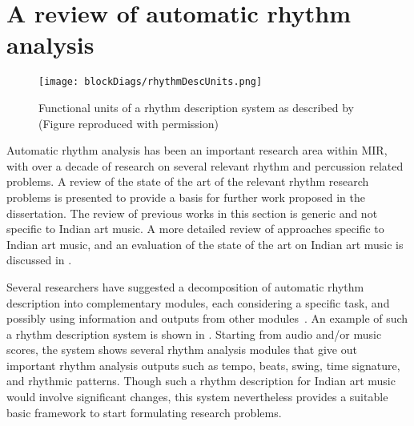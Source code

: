 \section[A review of automatic rhythm analysis]{A review of automatic rhythm\\ analysis}
\begin{figure}
\centering
\texttt{[image: blockDiags/rhythmDescUnits.png]}
\caption[Functional units of a rhythm description system]{Functional units of a rhythm description system as described by \protect{} (Figure reproduced with permission)}\label{fig:sota:rhythmdescsys}
\end{figure}
Automatic rhythm analysis has been an important research area within \gls{MIR}, with over a decade of research on several relevant rhythm and percussion related problems. A review of the state of the art of the relevant rhythm research problems is presented to provide a basis for further work proposed in the dissertation. The review of previous works in this section is generic and not specific to Indian art music. A more detailed review of approaches specific to Indian art music, and an evaluation of the state of the art on Indian art music is discussed in . 
%

Several researchers have suggested a decomposition of automatic rhythm description into complementary modules, each considering a specific task, and possibly using information and outputs from other modules~\cite{gouyon:05:phdthesis,gouyon:05:review}. An example of such a rhythm description system is shown in . Starting from audio and/or music scores, the system shows several rhythm analysis modules that give out important rhythm analysis outputs such as tempo, beats, swing, time signature, and rhythmic patterns. Though such a rhythm description for Indian art music would involve significant changes, this system nevertheless provides a suitable basic framework to start formulating research problems. 
